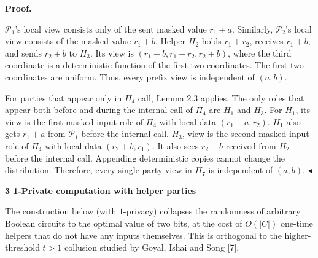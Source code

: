 \documentclass[10pt,a4paper]{article}
\begin{document}



\par\medskip\noindent\textbf{Proof.}\par




$\mathcal{P}_{1}$’s local view consists only of the sent masked value $r_{1}+a$. Similarly, $\mathcal{P}_{2}$’s local view consists of the masked value $r_{1}+b$. Helper $H_{2}$ holds $r_{1}+r_{2}$, receives $r_{1}+b$, and sends $r_{2}+b$ to $H_{3}$. Its view is $(r_{1}+b,r_{1}+r_{2},r_{2}+b)$, where the third coordinate is a deterministic function of the first two coordinates. The first two coordinates are uniform. Thus, every prefix view is independent of $(a,b)$.\par




For parties that appear only in $\Pi_{4}$ call, Lemma 2.3 applies. The only roles that appear both before and during the internal call of $\Pi_{4}$ are $H_{1}$ and $H_{3}$. For $H_{1}$, its view is the first masked-input role of $\Pi_{4}$ with local data $(r_{1}+a,r_{2})$. $H_{1}$ also gets $r_{1}+a$ from $\mathcal{P}_{1}$ before the internal call. $H_{3}$, view is the second masked-input role of $\Pi_{4}$ with local data $(r_{2}+b,r_{1})$. It also sees $r_{2}+b$ received from $H_{2}$ before the internal call. Appending deterministic copies cannot change the distribution. Therefore, every single-party view in $\Pi_{7}$ is independent of $(a,b)$.
$\blacktriangleleft$\par







\par\medskip\noindent\textbf{
3 1-Private computation with helper parties}\par




The construction below (with $1$-privacy) collapses the randomness of arbitrary Boolean circuits to the optimal value of two bits, at the cost of $O(|C|)$ one-time helpers that do not have any inputs themselves. This is orthogonal to the higher-threshold $t>1$ collusion studied by Goyal, Ishai and Song [7].\par
\end{document}
